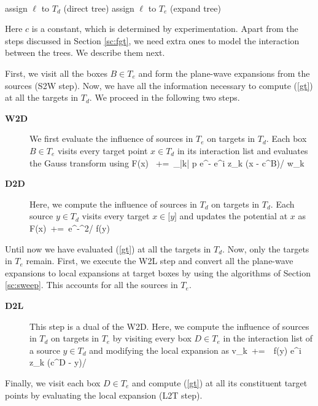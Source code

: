 {\tt
\begin{algorithmic}
\STATE
          \STATE assign $\ell$ to $T_d$ (direct tree)
      \ELSE
          \STATE assign $\ell$ to $T_e$ (expand tree)
      \ENDIF
  \ENDFOR
\STATE
\end{algorithmic}
}

Here $c$ is a constant, which is determined by experimentation. Apart from the steps discussed in Section \ref{sc:fgt}, we
 need extra ones to model the interaction between the trees. We describe them next.  

First, we visit all the boxes $B \in T_e$ and form the plane-wave expansions from the sources (S2W step). Now, we have 
all the information necessary to compute (\ref{gt}) at all the targets in $T_d$. We proceed in the following two steps.
\begin{description}
\item[\textbf{W2D}] We first evaluate the influence of sources in $T_e$ on targets in $T_d$. Each box $B \in T_e$ visits
 every target point $x \in T_d$ in its interaction list and evaluates the Gauss transform using
%
\beq F(x) \, +=\, \sum_{|k| \leq p} e^{-} e^{i z_k \cdot (x - c^B)/\sqrt{\delta}} w_k \eeq
%
\item[\textbf{D2D}] Here, we compute the influence of sources in $T_d$ on targets in $T_d$. Each source $y \in T_d$ visits 
every target $x \in \mathcal[y]$ and updates the potential at $x$ as 
%  
\beq F(x) \,+=\, e^{-^2/\sqrt{\delta}} f(y) \eeq
%
\end{description}
%
Until now we have evaluated (\ref{gt}) at all the targets in $T_d$. Now, only the targets in $T_e$ remain. First, we execute
 the W2L step and convert all the plane-wave expansions to local expansions at target boxes by using the algorithms of 
 Section \ref{sc:sweep}. This accounts for all the sources in $T_e$. 

\begin{description}
\item[\textbf{D2L}] This step is a dual of the W2D. Here, we compute the influence of sources in $T_d$ on targets in $T_e$ by 
visiting every box $D \in T_e$ in the interaction list of a source $y \in T_d$ and modifying the local expansion as 
%
\beq v_k  \,+=\, \, f(y) e^{i z_k \cdot (c^D - y)/\sqrt{\delta}} \eeq
\end{description}
Finally, we visit each box $D \in T_e$ and compute (\ref{gt}) at all its constituent target points by evaluating the 
local expansion (L2T step). 

